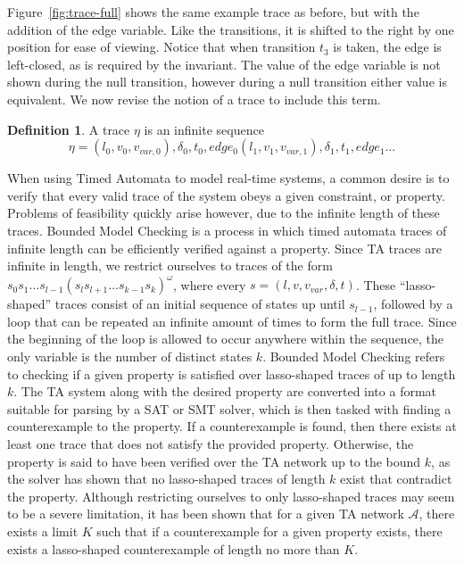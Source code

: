 \documentclass[a4paper,11pt]{report}
\theoremstyle{definition}
\newtheorem{defn}{Definition}[section]
\begin{document}
Figure~\ref{fig:trace-full} shows the same example trace as before, but with the
addition of the edge variable. Like the transitions, it is shifted to the right
by one position for ease of viewing. Notice that when transition $t_{3}$ is
taken, the edge is left-closed, as is required by the invariant. The value of
the edge variable is not shown during the null transition, however during a null
transition either value is equivalent. We now revise the notion of a trace to
include this term.
\begin{defn} A trace $\eta$ is an infinite sequence
  \[\eta = (l_{0},v_{0},v_{var,0}),\delta_{0},t_{0},edge_{0}(l_{1},v_{1},v_{var,1}),\delta_{1},t_{1},edge_{1} \ldots\]
\end{defn}

When using Timed Automata to model real-time systems, a common desire is to
verify that every valid trace of the system obeys a given constraint, or
property. Problems of feasibility quickly arise however, due to the infinite
length of these traces. Bounded Model Checking is a process in which timed
automata traces of infinite length can be efficiently verified against a
property. Since TA traces are infinite in length, we restrict ourselves to
traces of the form
\(s_0 s_1\ldots s_{l-1}{(s_l s_{l+1}\ldots s_{k-1}s_k)}^\omega\), where every
$s = (l,v,v_{var},\delta,t)$. These ``lasso-shaped'' traces consist of an
initial sequence of states up until \(s_{l-1}\), followed by a loop that can be
repeated an infinite amount of times to form the full trace. Since the beginning
of the loop is allowed to occur anywhere within the sequence, the only variable
is the number of distinct states \(k\). Bounded Model Checking refers to
checking if a given property is satisfied over lasso-shaped traces of up to
length \(k\). The TA system along with the desired property are converted into a
format suitable for parsing by a SAT or SMT solver, which is then tasked with
finding a counterexample to the property. If a counterexample is found, then
there exists at least one trace that does not satisfy the provided property.
Otherwise, the property is said to have been verified over the TA network up to
the bound \(k\), as the solver has shown that no lasso-shaped traces of length
\(k\) exist that contradict the property. Although restricting ourselves to only
lasso-shaped traces may seem to be a severe limitation, it has been shown that
for a given TA network $\mathcal{A}$, there exists a limit $K$ such that if a
counterexample for a given property exists, there exists a lasso-shaped
counterexample of length no more than $K$\cite{biere99}.
\end{document}
